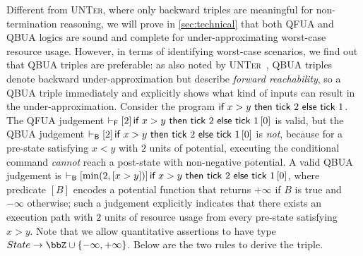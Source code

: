 Different from \textsc{UNTer}, where only backward triples are meaningful for non-termination reasoning, we will prove in \cref{sec:technical} that both QFUA and QBUA logics are sound and complete for under-approximating worst-case resource usage.
%
However, in terms of identifying worst-case scenarios, we find out that QBUA triples are preferable:
as also noted by \textsc{UNTer}~\cite{OOPSLA:RVO24}, QBUA triples denote backward under-approximation but describe \emph{forward reachability}, so a QBUA triple immediately and explicitly shows what kind of inputs can result in the under-approximation.
%
Consider the program $\textsf{if}~x>y~\textsf{then}~\textsf{tick}~2~\textsf{else}~\textsf{tick}~1$.
%
The QFUA judgement $\vdash_{\mathsf{F}}\left[2\right]\textsf{if}~x>y~\textsf{then}~\textsf{tick}~2~\textsf{else}~\textsf{tick}~1\left[0\right]$ is valid, but the QBUA judgement $\vdash_{\mathsf{B}}\left[2\right]\textsf{if}~x>y~\textsf{then}~\textsf{tick}~2~\textsf{else}~\textsf{tick}~1\left[0\right]$ is \emph{not}, because for a pre-state satisfying $x<y$ with $2$ units of potential, executing the conditional command \emph{cannot} reach a post-state with non-negative potential.
%
A valid QBUA judgement is $\vdash_{\mathsf{B}}\left[\min(2,[x>y])\right]\textsf{if}~x>y~\textsf{then}~\textsf{tick}~2~\textsf{else}~\textsf{tick}~1\left[0\right]$, where predicate $[B]$ encodes a potential function that returns $+\infty$ if $B$ is true and $-\infty$ otherwise; such a judgement explicitly indicates that there exists an execution path with $2$ units of resource usage from every pre-state satisfying $x>y$.
%
Note that we allow quantitative assertions to have type $State \to \bbZ \cup \{ {-\infty},{+\infty}\}$.
%
Below are the two rules to derive the triple.

